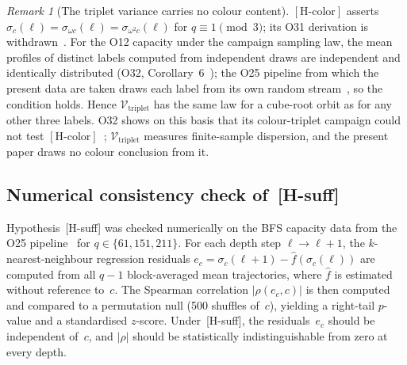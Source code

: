 \documentclass[11pt,a4paper]{article}
\theoremstyle{plain}
\theoremstyle{definition}
\theoremstyle{remark}
\newtheorem{remark}[theorem]{Remark}
\begin{document}
    \begin{remark}[The triplet variance carries no colour content]
      \label{rem:hcolor}
      $[\mathrm{H\text{-}color}]$ asserts
      $\sigma_c(\ell) = \sigma_{\omega c}(\ell) = \sigma_{\omega^2 c}(\ell)$
      for $q \equiv 1 \pmod{3}$; its O31 derivation is withdrawn~\cite{Beau2026a35}.
      For the O12 capacity under the campaign sampling law, the mean profiles of distinct labels
      computed from independent draws are independent and identically distributed (O32,
      Corollary~6~\cite{Beau2026a36}); the O25 pipeline from which the present data are taken
      draws each label from its own random stream~\cite{Beau2026a29}, so the condition holds. Hence
      $\mathcal{V}_{\mathrm{triplet}}$ has the same law for a cube-root orbit as for any other
      three labels.
      O32 shows on this basis that its colour-triplet campaign could not test
      $[\mathrm{H\text{-}color}]$~\cite{Beau2026a36}; $\mathcal{V}_{\mathrm{triplet}}$ measures
      finite-sample dispersion, and the present paper draws no colour conclusion from it.
    \end{remark}

  \subsection{Numerical consistency check of~\textup{[H-suff]}}
    \label{sec:hsuff-test}

    Hypothesis~\textup{[H-suff]} was checked numerically on the BFS capacity data
    from the O25 pipeline~\cite{Beau2026a29}
    for $q \in \{61, 151, 211\}$.
    For each depth step $\ell \to \ell+1$,
    the $k$-nearest-neighbour regression residuals
    $e_c = \sigma_c(\ell+1) - \hat{f}(\sigma_c(\ell))$
    are computed from all $q-1$ block-averaged mean trajectories,
    where $\hat{f}$ is estimated without reference to~$c$.
    The Spearman correlation $|\rho(e_c, c)|$ is then computed
    and compared to a permutation null (500 shuffles of~$c$),
    yielding a right-tail $p$-value and a standardised $z$-score.
    Under~\textup{[H-suff]}, the residuals~$e_c$ should be independent
    of~$c$, and $|\rho|$ should be statistically indistinguishable
    from zero at every depth.
\end{document}
